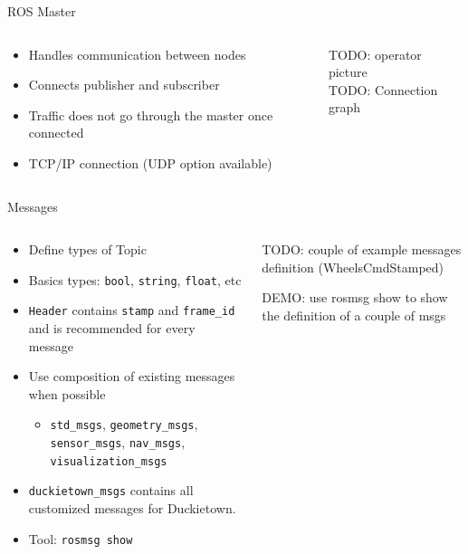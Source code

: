 \documentclass{beamer}
\newcommand{\bashinline}[1]{\texttt{#1}}
\begin{document}
\begin{frame}{ROS Master}
	\begin{columns}
		\begin{column}{0.6\textwidth}
			\begin{itemize}
			\item Handles communication between nodes
			\item Connects publisher and subscriber
			\item Traffic does \alert{not} go through the master once connected
			\item TCP/IP connection (UDP option available)
			\end{itemize}
		\end{column}
		\begin{column}{0.4\textwidth}
			\centering
			TODO: operator picture\\
			TODO: Connection graph
		\end{column}
	\end{columns}
\end{frame}

\begin{frame}{Messages}
	\begin{columns}
		\begin{column}{0.6\textwidth}
			\begin{itemize}
				\item Define types of Topic
				\item Basics types: \bashinline{bool}, \bashinline{string}, \bashinline{float}, etc
				\item \bashinline{Header} contains \bashinline{stamp} and \bashinline{frame_id} and is recommended for every message
				\item Use composition of existing messages when possible
					\begin{itemize}
						\item \bashinline{std_msgs}, \bashinline{geometry_msgs}, \bashinline{sensor_msgs}, \bashinline{nav_msgs}, \bashinline{visualization_msgs}
					\end{itemize}
				\item \bashinline{duckietown_msgs} contains all customized messages for Duckietown.
				\item Tool: \texttt{rosmsg show}
			\end{itemize}
		\end{column}
	\begin{column}{0.4\textwidth}
		\centering
		TODO: couple of example messages definition (WheelsCmdStamped)

		DEMO: use rosmsg show to show the definition of a couple of msgs
		\end{column}
	\end{columns}
\end{frame}
\end{document}
